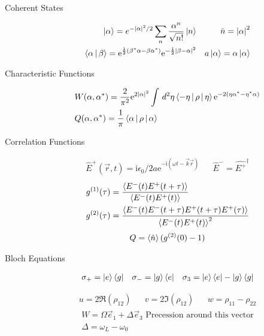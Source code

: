 \documentclass[twocolumn, 11pt]{article}
\renewcommand{\i}{\mathrm{i}}
\newcommand{\e}{\mathrm{e}}
\newcommand{\abs}[1]{\left| #1 \right|}
\renewcommand{\d}[1]{\,d{#1}}
\begin{document}
\begin{description}
  \item[Coherent States]
    \begin{align*}
      \Ket{\alpha} = e^{- \abs{\alpha}^2 /2} \sum_{n}^{} \frac{\alpha^n}{\sqrt{n!}} \Ket{n} && \bar{n} = \abs{\alpha}^2 \\
      \Braket{\alpha | \beta} = \e^{\frac{1}{2} (\beta ^{\ast} \alpha - \beta \alpha^{\ast})}
      \e^{- \frac{1}{2} \abs{\beta - \alpha}^{2}} && a \Ket{\alpha} = \alpha \Ket{\alpha} 
    \end{align*}
  \item[Characteristic Functions]
    \begin{align*}
      & W(\alpha, \alpha ^{\ast}) = \frac{2}{\pi^2} \e^{2 \abs{\alpha}^2}
      \int \d{^2 \eta} \Braket{- \eta | \rho | \eta} \e^{-2 (\eta \alpha ^{\ast} - \eta^{\ast} \alpha)} \\
      & Q(\alpha, \alpha^{\ast}) = \frac{1}{\pi} \Braket{\alpha | \rho | \alpha}
    \end{align*}
  \item [Correlation Functions]
    \begin{align*}
      \hat{E}^+(\vec{r}, t) = \i \epsilon_0/2 a \e^{-\i (\omega t - \vec{k} \vec{r})}
      && \hat{E}^- = \hat{E^+} ^{\dagger}
    \end{align*}
    \begin{align*}
      g^{(1)}(\tau) & = \frac{\Braket{E^-(t) E^+(t+\tau)}}{\Braket{E^-(t) E^+(t)}} \\
      g^{(2)}(\tau) & = \frac{\Braket{E^-(t) E^-(t + \tau) E^+(t + \tau) E^+(\tau) }}{\Braket{E^-(t) E^+(t)}^2}
    \end{align*}
    \begin{align*}
      Q = \Braket{\hat{n}} (g^{(2)}(0) - 1)
    \end{align*}
  \item[Bloch Equations]
    \begin{align*}
      \sigma_+ = \Ket{e}\Bra{g} && \sigma_- = \Ket{g}\Bra{e} && \sigma_3 = \Ket{e}\Bra{e} - \Ket{g}\Bra{g}
    \end{align*}
    
    \begin{align*}
      u = 2 \Re (\rho_{12}) && v = 2 \Im(\rho_{12}) && w = \rho_{11} - \rho_{22}
    \end{align*}
    \begin{align*}
      W = \Omega \vec{e}_1 + \Delta \vec{e}_3 \text{ Precession around this vector} \\
\Delta = \omega_L - \omega_0
    \end{align*}
    
    
\end{description}
\end{document}

